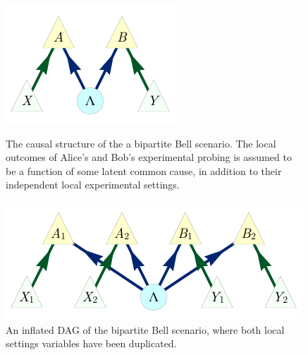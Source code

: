
\begin{figure}[ht]
\centering
\begin{minipage}[t]{0.45\linewidth}
\centering
\includegraphics[scale=1]{BellDagRaw.pdf}
\caption{The causal structure of the a bipartite Bell scenario. The local outcomes of Alice's and Bob's experimental probing is assumed to be a function of some latent common cause, in addition to their independent local experimental settings.}\label{fig:NewBellDAG1}
\end{minipage}
\hfill
\begin{minipage}[t]{0.45\linewidth}
\centering
\includegraphics[scale=1]{BellDagCopy.pdf}
\caption{An inflated DAG of the bipartite Bell scenario, where both local settings variables have been duplicated.}\label{fig:BellDagCopy1}
\end{minipage}
\end{figure}


